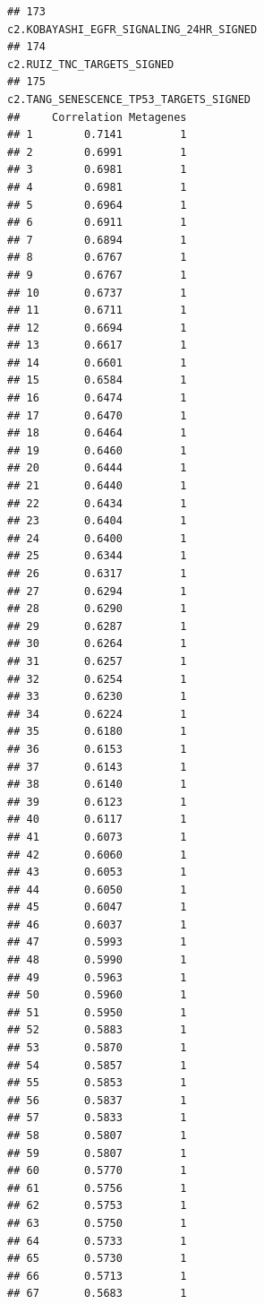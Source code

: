\documentclass{article}\usepackage[]{graphicx}\usepackage[]{color}
\makeatletter
\newenvironment{kframe}{%
 \def\at@end@of@kframe{}%
 \ifinner\ifhmode%
  \def\at@end@of@kframe{\end{minipage}}%
  \begin{minipage}{\columnwidth}%
 \fi\fi%
 \def\FrameCommand##1{\hskip\@totalleftmargin \hskip-\fboxsep
 \colorbox{shadecolor}{##1}\hskip-\fboxsep
     \hskip-\linewidth \hskip-\@totalleftmargin \hskip\columnwidth}%
 \MakeFramed {\advance\hsize-\width
   \@totalleftmargin\z@ \linewidth\hsize
   \@setminipage}}%
 {\par\unskip\endMakeFramed%
 \at@end@of@kframe}
\newenvironment{knitrout}{}{} %
\makeatother
\begin{document}
\begin{knitrout}
\begin{kframe}
\begin{verbatim}
## 173                                                                                                                                                                          c2.KOBAYASHI_EGFR_SIGNALING_24HR_SIGNED
## 174                                                                                                                                                                                       c2.RUIZ_TNC_TARGETS_SIGNED
## 175                                                                                                                                                                           c2.TANG_SENESCENCE_TP53_TARGETS_SIGNED
##     Correlation Metagenes
## 1        0.7141         1
## 2        0.6991         1
## 3        0.6981         1
## 4        0.6981         1
## 5        0.6964         1
## 6        0.6911         1
## 7        0.6894         1
## 8        0.6767         1
## 9        0.6767         1
## 10       0.6737         1
## 11       0.6711         1
## 12       0.6694         1
## 13       0.6617         1
## 14       0.6601         1
## 15       0.6584         1
## 16       0.6474         1
## 17       0.6470         1
## 18       0.6464         1
## 19       0.6460         1
## 20       0.6444         1
## 21       0.6440         1
## 22       0.6434         1
## 23       0.6404         1
## 24       0.6400         1
## 25       0.6344         1
## 26       0.6317         1
## 27       0.6294         1
## 28       0.6290         1
## 29       0.6287         1
## 30       0.6264         1
## 31       0.6257         1
## 32       0.6254         1
## 33       0.6230         1
## 34       0.6224         1
## 35       0.6180         1
## 36       0.6153         1
## 37       0.6143         1
## 38       0.6140         1
## 39       0.6123         1
## 40       0.6117         1
## 41       0.6073         1
## 42       0.6060         1
## 43       0.6053         1
## 44       0.6050         1
## 45       0.6047         1
## 46       0.6037         1
## 47       0.5993         1
## 48       0.5990         1
## 49       0.5963         1
## 50       0.5960         1
## 51       0.5950         1
## 52       0.5883         1
## 53       0.5870         1
## 54       0.5857         1
## 55       0.5853         1
## 56       0.5837         1
## 57       0.5833         1
## 58       0.5807         1
## 59       0.5807         1
## 60       0.5770         1
## 61       0.5756         1
## 62       0.5753         1
## 63       0.5750         1
## 64       0.5733         1
## 65       0.5730         1
## 66       0.5713         1
## 67       0.5683         1

\end{verbatim}
\end{kframe}
\end{knitrout}
\end{document}
